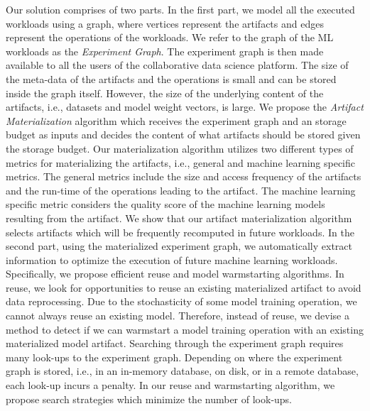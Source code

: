 Our solution comprises of two parts.
In the first part, we model all the executed workloads using a graph, where vertices represent the artifacts and edges represent the operations of the workloads.
We refer to the graph of the ML workloads as the \textit{Experiment Graph}.
The experiment graph is then made available to all the users of the collaborative data science platform.
The size of the meta-data of the artifacts and the operations is small and can be stored inside the graph itself.
However, the size of the underlying content of the artifacts, i.e., datasets and model weight vectors, is large.
We propose the \textit{Artifact Materialization} algorithm which receives the experiment graph and an storage budget as inputs and decides the content of what artifacts should be stored given the storage budget.
Our materialization algorithm utilizes two different types of metrics for materializing the artifacts, i.e., general and machine learning specific metrics.
The general metrics include the size and access frequency of the artifacts and the run-time of the operations leading to the artifact.
The machine learning specific metric considers the quality score of the machine learning models resulting from the artifact.
We show that our artifact materialization algorithm selects artifacts which will be frequently recomputed in future workloads.
In the second part, using the materialized experiment graph, we automatically extract information to optimize the execution of future machine learning workloads.
Specifically, we propose efficient reuse and model warmstarting algorithms.
In reuse, we look for opportunities to reuse an existing materialized artifact to avoid data reprocessing.
Due to the stochasticity of some model training operation, we cannot always reuse an existing model.
Therefore, instead of reuse, we devise a method to detect if we can warmstart a model training operation with an existing materialized model artifact.
Searching through the experiment graph requires many look-ups to the experiment graph.
Depending on where the experiment graph is stored, i.e., in an in-memory database, on disk, or in a remote database, each look-up incurs a penalty.
In our reuse and warmstarting algorithm, we propose search strategies which minimize the number of look-ups.

